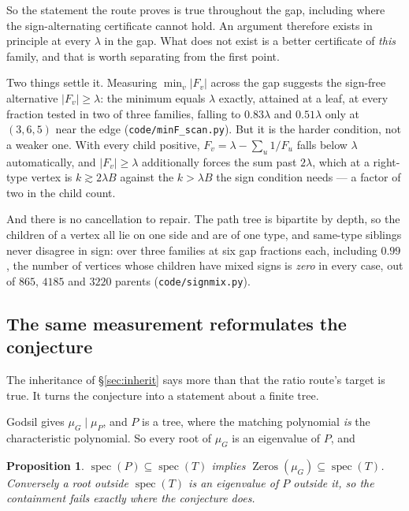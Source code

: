 \documentclass[11pt]{article}
\newtheorem{proposition}[theorem]{Proposition}
\theoremstyle{remark}
\begin{document}
So the statement the route proves is true throughout the gap, including where the
sign-alternating certificate cannot hold. An argument therefore exists in principle at every
$\lambda$ in the gap. What does not exist is a better certificate of \emph{this} family, and that
is worth separating from the first point.

Two things settle it. Measuring $\min_v|F_v|$ across the gap suggests the sign-free alternative
$|F_v|\ge\lambda$: the minimum equals $\lambda$ exactly, attained at a leaf, at every fraction
tested in two of three families, falling to $0.83\lambda$ and $0.51\lambda$ only at $(3,6,5)$ near
the edge (\texttt{code/minF\_scan.py}). But it is the harder condition, not a weaker one. With
every child positive, $F_v=\lambda-\sum_u1/F_u$ falls below $\lambda$ automatically, and
$|F_v|\ge\lambda$ additionally forces the sum past $2\lambda$, which at a right-type vertex is
$k\gtrsim2\lambda B$ against the $k>\lambda B$ the sign condition needs --- a factor of two in the
child count.

And there is no cancellation to repair. The path tree is bipartite by depth, so the children of a
vertex all lie on one side and are of one type, and same-type siblings never disagree in sign: over
three families at six gap fractions each, including $0.99$, the number of vertices whose children
have mixed signs is \emph{zero} in every case, out of $865$, $4185$ and $3220$ parents
(\texttt{code/signmix.py}).

\subsection{The same measurement reformulates the conjecture}\label{sec:reform}

The inheritance of \S\ref{sec:inherit} says more than that the ratio route's target is true. It
turns the conjecture into a statement about a finite tree.

Godsil gives $\mu_G\mid\mu_P$, and $P$ is a tree, where the matching polynomial \emph{is} the
characteristic polynomial. So every root of $\mu_G$ is an eigenvalue of $P$, and

\begin{proposition}\label{prop:reform}
$\operatorname{spec}(P)\subseteq\operatorname{spec}(T)$ implies
$\operatorname{Zeros}(\mu_G)\subseteq\operatorname{spec}(T)$. Conversely a root outside
$\operatorname{spec}(T)$ is an eigenvalue of $P$ outside it, so the containment fails exactly
where the conjecture does.
\end{proposition}
\end{document}
